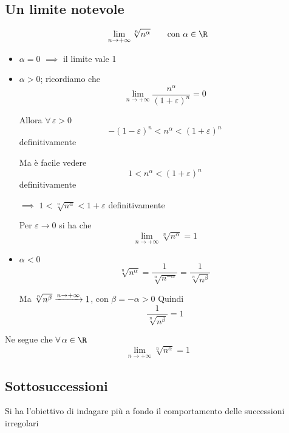 
\subsection{Un limite notevole}

\[
    \lim_{n\to +\infty} \sqrt[n]{n^{\alpha}}\qquad\text{con }\alpha \in \R
\]
\begin{itemize}
    \item $ \alpha = 0$ $\implies$ il limite vale 1
    \item $ \alpha >0 $; ricordiamo che \[
        \lim_{n\to +\infty} \frac{n^{\alpha}}{(1+ \varepsilon)^{n}} =0
    \]

    Allora $ \forall\, \varepsilon>0 $ \[
        -(1- \varepsilon)^{n}<n^{\alpha}<(1+ \varepsilon)^{n}
    \] definitivamente

    Ma è facile vedere \[
        1<n^{\alpha}<(1+ \varepsilon)^{n}
    \] definitivamente 
    
    $\implies$ $ 1<\sqrt[n]{n^{\alpha}}<1+ \varepsilon $ definitivamente

    Per $ \varepsilon\to 0 $ si ha che
    \[
        \lim_{n\to +\infty} \sqrt[n]{n^{\alpha}} =1
    \]
    \item $ \alpha < 0 $
    \[
        \sqrt[n]{n^{\alpha}}=\frac{1}{\sqrt[n]{n^{-\alpha}}}=\frac{1}{\sqrt[n]{n^{\beta}}}
    \]

    Ma $ \sqrt[n]{n^{\beta}} \xrightarrow{n\to +\infty} 1 \displaystyle$, con $ \beta =-\alpha>0 $
    Quindi \[
        \frac{1}{\sqrt[n]{n^{\beta}}}=1
    \]
\end{itemize}
Ne segue che $ \forall\, \alpha \in \R $
\[
    \lim_{n\to +\infty} \sqrt[n]{n^{\alpha}}=1
\]


\subsection{Sottosuccessioni}

Si ha l'obiettivo di indagare più a fondo il comportamento delle successioni irregolari


